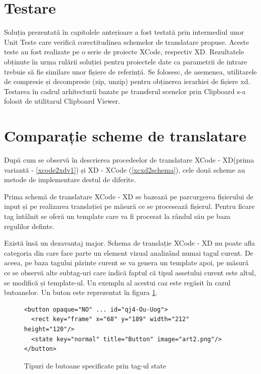 \section{Testare}

Soluția prezentată în capitolele anterioare a fost testată prin intermediul unor Unit Teste care verifică corectitudinea schemelor de translatare propuse. 
Aceste teste au fost realizate pe o serie de proiecte XCode, respectiv XD. Rezultatele obținute în urma rulării soluției pentru proiectele date ca parametrii de intrare trebuie să fie similare unor fișiere de referință. Se folosesc, de asemenea, utilitarele de compresie și decompresie (zip, unzip) pentru obținerea ierarhiei de fișiere xd. 
Testarea în cadrul arhitecturii bazate pe transferul scenelor prin Clipboard s-a folosit de utilitarul Clipboard Viewer.

\section{Comparație scheme de translatare}

După cum se observă în descrierea procedeelor de translatare XCode - XD(prima variantă - \ref{xcode2xdv1}) și XD - XCode (\ref{xcxd2schema}), cele două scheme au metode de implementare destul de diferite. 

Prima schemă de translatare XCode - XD se bazează pe parcurgerea fișierului de input și pe realizarea translației pe măsură ce se procesează fișierul. Pentru ficare tag întâlnit se oferă un template care va fi procesat la rândul său pe baza regulilor definte. 

Există însă un dezavantaj major. Schema de translație XCode - XD nu poate afla categoria din care face parte un element vizual analizând numai tagul curent. De aceea, pe baza tagului părinte curent se va genera un template apoi, pe măsură ce se observă alte subtag-uri care indică faptul că tipul assetului curent este altul, se modifică și template-ul. Un exemplu al acestui caz este regăsit în cazul butoanelor. Un buton este reprezentat în figura \ref{fig:state}.

\begin{figure}[!htbp]
\lstset{language=XML}
\begin{lstlisting}
<button opaque="NO" ... id="qj4-Ou-Uog">
  <rect key="frame" x="68" y="189" width="212" height="120"/>
  <state key="normal" title="Button" image="art2.png"/>
</button>
\end{lstlisting}
\caption{Tipuri de butoane specificate prin tag-ul state} \label{fig:state}
\end{figure}

